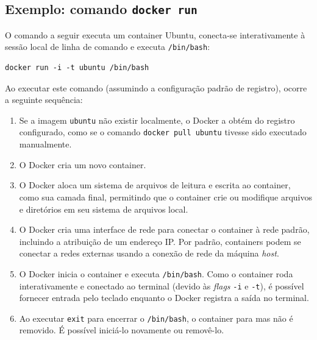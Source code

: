 \subsection{Exemplo: comando \texttt{docker run}}

O comando a seguir executa um container Ubuntu, conecta-se interativamente à sessão local de linha de comando e executa \texttt{/bin/bash}:

\begin{verbatim}
docker run -i -t ubuntu /bin/bash
\end{verbatim}

Ao executar este comando (assumindo a configuração padrão de registro), ocorre a seguinte sequência:

\begin{enumerate}
    \item Se a imagem \texttt{ubuntu} não existir localmente, o Docker a obtém do registro configurado, como se o comando \texttt{docker pull ubuntu} tivesse sido executado manualmente.
    \item O Docker cria um novo container.
    \item O Docker aloca um sistema de arquivos de leitura e escrita ao container, como sua camada final, permitindo que o container crie ou modifique arquivos e diretórios em seu sistema de arquivos local.
    \item O Docker cria uma interface de rede para conectar o container à rede padrão, incluindo a atribuição de um endereço IP. Por padrão, containers podem se conectar a redes externas usando a conexão de rede da máquina \textit{host}.
    \item O Docker inicia o container e executa \texttt{/bin/bash}. Como o container roda interativamente e conectado ao terminal (devido às \textit{flags} \texttt{-i} e \texttt{-t}), é possível fornecer entrada pelo teclado enquanto o Docker registra a saída no terminal.
    \item Ao executar \texttt{exit} para encerrar o \texttt{/bin/bash}, o container para mas não é removido. É possível iniciá-lo novamente ou removê-lo.
\end{enumerate}
